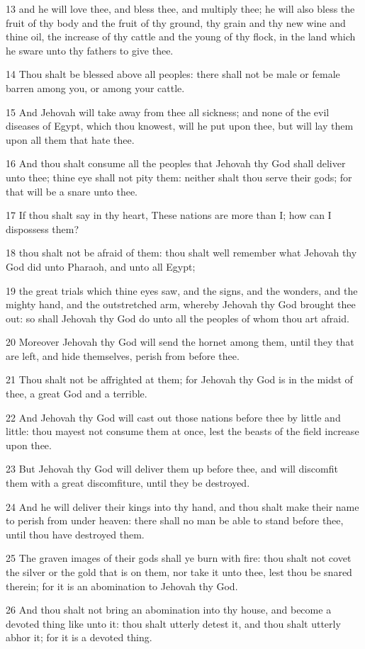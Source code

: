 \par 13 and he will love thee, and bless thee, and multiply thee; he will also bless the fruit of thy body and the fruit of thy ground, thy grain and thy new wine and thine oil, the increase of thy cattle and the young of thy flock, in the land which he sware unto thy fathers to give thee.
\par 14 Thou shalt be blessed above all peoples: there shall not be male or female barren among you, or among your cattle.
\par 15 And Jehovah will take away from thee all sickness; and none of the evil diseases of Egypt, which thou knowest, will he put upon thee, but will lay them upon all them that hate thee.
\par 16 And thou shalt consume all the peoples that Jehovah thy God shall deliver unto thee; thine eye shall not pity them: neither shalt thou serve their gods; for that will be a snare unto thee.
\par 17 If thou shalt say in thy heart, These nations are more than I; how can I dispossess them?
\par 18 thou shalt not be afraid of them: thou shalt well remember what Jehovah thy God did unto Pharaoh, and unto all Egypt;
\par 19 the great trials which thine eyes saw, and the signs, and the wonders, and the mighty hand, and the outstretched arm, whereby Jehovah thy God brought thee out: so shall Jehovah thy God do unto all the peoples of whom thou art afraid.
\par 20 Moreover Jehovah thy God will send the hornet among them, until they that are left, and hide themselves, perish from before thee.
\par 21 Thou shalt not be affrighted at them; for Jehovah thy God is in the midst of thee, a great God and a terrible.
\par 22 And Jehovah thy God will cast out those nations before thee by little and little: thou mayest not consume them at once, lest the beasts of the field increase upon thee.
\par 23 But Jehovah thy God will deliver them up before thee, and will discomfit them with a great discomfiture, until they be destroyed.
\par 24 And he will deliver their kings into thy hand, and thou shalt make their name to perish from under heaven: there shall no man be able to stand before thee, until thou have destroyed them.
\par 25 The graven images of their gods shall ye burn with fire: thou shalt not covet the silver or the gold that is on them, nor take it unto thee, lest thou be snared therein; for it is an abomination to Jehovah thy God.
\par 26 And thou shalt not bring an abomination into thy house, and become a devoted thing like unto it: thou shalt utterly detest it, and thou shalt utterly abhor it; for it is a devoted thing.

